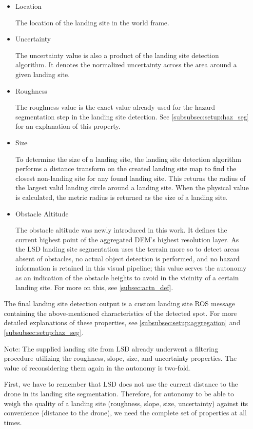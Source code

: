 \begin{itemize}
    \item Location

    The location of the landing site in the world frame.
    \item Uncertainty

    The uncertainty value is also a product of the landing site detection algorithm. It denotes the normalized uncertainty across the area around a given landing site. 
    \item Roughness

    The roughness value is the exact value already used for the hazard segmentation step in the landing site detection. See \cref{subsubsec:setup:haz_seg} for an explanation of this property.
    \item Size

    To determine the size of a landing site, the landing site detection algorithm performs a distance transform on the created landing site map to find the closest non-landing site for any found landing site. This returns the radius of the largest valid landing circle around a landing site. When the physical value is calculated, the metric radius is returned as the size of a landing site.
    \item Obstacle Altitude

    The obstacle altitude was newly introduced in this work. It defines the current highest point of the aggregated DEM's highest resolution layer. As the LSD landing site segmentation uses the terrain more so to detect areas absent of obstacles, no actual object detection is performed, and no hazard information is retained in this visual pipeline; this value serves the autonomy as an indication of the obstacle heights to avoid in the vicinity of a certain landing site. For more on this, see \cref{subsec:actn_def}.
\end{itemize}

The final landing site detection output is a custom landing site ROS message containing the above-mentioned characteristics of the detected spot. For more detailed explanations of these properties, see \cref{subsubsec:setup:aggregation} and \cref{subsubsec:setup:haz_seg}.

Note: The supplied landing site from LSD already underwent a filtering procedure utilizing the roughness, slope, size, and uncertainty properties. The value of reconsidering them again in the autonomy is two-fold.

First, we have to remember that LSD does not use the current distance to the drone in its landing site segmentation. Therefore, for autonomy to be able to weigh the quality of a landing site (roughness, slope, size, uncertainty) against its convenience (distance to the drone), we need the complete set of properties at all times.

